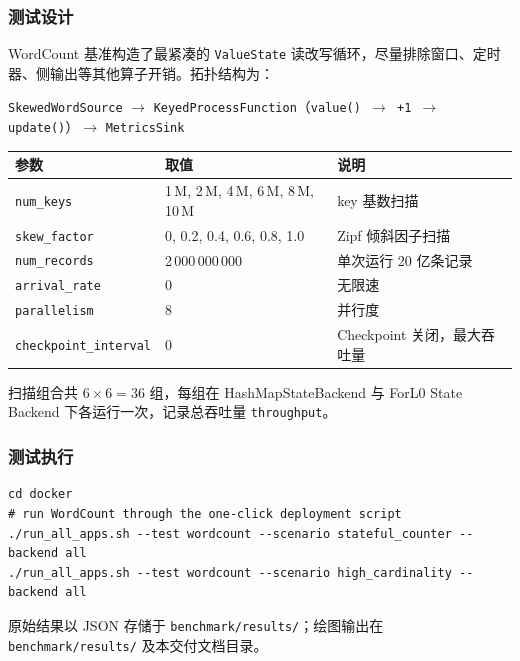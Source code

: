 \documentclass[a4paper,11pt]{article}
\newcommand{\project}{ForL0 State Backend}
\begin{document}
\subsubsection{测试设计}

WordCount 基准构造了最紧凑的 \texttt{ValueState} 读改写循环，尽量排除窗口、定时器、侧输出等其他算子开销。拓扑结构为：

\begin{center}
\small\sffamily
\texttt{SkewedWordSource} $\rightarrow$ \texttt{KeyedProcessFunction}（\texttt{value() $\to$ +1 $\to$ update()}）$\rightarrow$ \texttt{MetricsSink}
\end{center}

\begin{table}[H]
\centering
\small
\begin{tabularx}{\textwidth}{L{3.4cm} L{3.2cm} X}
\toprule
\textbf{参数} & \textbf{取值} & \textbf{说明} \\
\midrule
\texttt{num\_keys}           & 1\,M, 2\,M, 4\,M, 6\,M, 8\,M, 10\,M & key 基数扫描 \\
\texttt{skew\_factor}        & 0, 0.2, 0.4, 0.6, 0.8, 1.0          & Zipf 倾斜因子扫描 \\
\texttt{num\_records}        & 2\,000\,000\,000 & 单次运行 20 亿条记录 \\
\texttt{arrival\_rate}       & 0 & 无限速 \\
\texttt{parallelism}         & 8 & 并行度 \\
\texttt{checkpoint\_interval}& 0 & Checkpoint 关闭，最大吞吐量 \\
\bottomrule
\end{tabularx}
\end{table}

扫描组合共 $6 \times 6 = 36$ 组，每组在 HashMapStateBackend 与 \project{} 下各运行一次，记录总吞吐量 \texttt{throughput}。

\subsubsection{测试执行}

\begin{lstlisting}[language=shellcmd]
cd docker
# run WordCount through the one-click deployment script
./run_all_apps.sh --test wordcount --scenario stateful_counter --backend all
./run_all_apps.sh --test wordcount --scenario high_cardinality --backend all
\end{lstlisting}

原始结果以 JSON 存储于 \texttt{benchmark/results/}；绘图输出在 \texttt{benchmark/results/} 及本交付文档目录。
\end{document}
